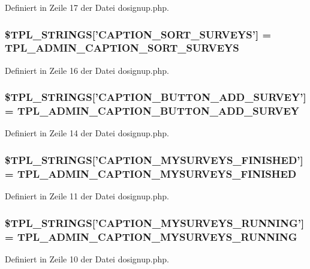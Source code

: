 Definiert in Zeile 17 der Datei dosignup.php.
\subsubsection{\setlength{\rightskip}{0pt plus 5cm}\$TPL\_\-STRINGS['CAPTION\_\-SORT\_\-SURVEYS'] = {\bf TPL\_\-ADMIN\_\-CAPTION\_\-SORT\_\-SURVEYS}}\label{dosignup_8php_b9a26ddab29e852efac383d6eae07bd0}




Definiert in Zeile 16 der Datei dosignup.php.
\subsubsection{\setlength{\rightskip}{0pt plus 5cm}\$TPL\_\-STRINGS['CAPTION\_\-BUTTON\_\-ADD\_\-SURVEY'] = {\bf TPL\_\-ADMIN\_\-CAPTION\_\-BUTTON\_\-ADD\_\-SURVEY}}\label{dosignup_8php_db8f21fccc808fd76b8500c931aa805d}




Definiert in Zeile 14 der Datei dosignup.php.
\subsubsection{\setlength{\rightskip}{0pt plus 5cm}\$TPL\_\-STRINGS['CAPTION\_\-MYSURVEYS\_\-FINISHED'] = {\bf TPL\_\-ADMIN\_\-CAPTION\_\-MYSURVEYS\_\-FINISHED}}\label{dosignup_8php_10cc234b1c962b8a41c8e127da00cb15}




Definiert in Zeile 11 der Datei dosignup.php.
\subsubsection{\setlength{\rightskip}{0pt plus 5cm}\$TPL\_\-STRINGS['CAPTION\_\-MYSURVEYS\_\-RUNNING'] = {\bf TPL\_\-ADMIN\_\-CAPTION\_\-MYSURVEYS\_\-RUNNING}}\label{dosignup_8php_f64e94061e69c2ed3b03ec93f7e517c9}




Definiert in Zeile 10 der Datei dosignup.php.
